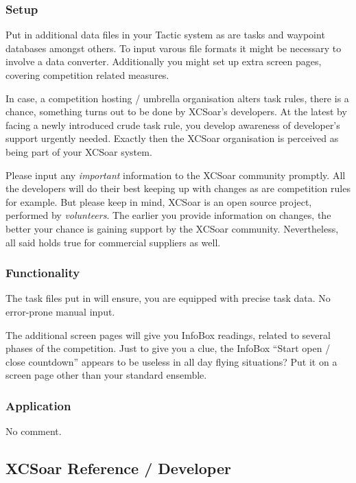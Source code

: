 \subsubsection*{Setup} Put in additional data files in your Tactic system as are 
tasks and waypoint databases amongst others. To input varous file formats it 
might be necessary to involve a data converter. Additionally you might set up 
extra screen pages, covering competition related measures.

In case, a competition hosting / umbrella organisation alters task rules, there 
is a chance, something turns out to be done by XCSoar's developers. At the latest 
by facing a newly introduced crude task rule, you develop awareness of 
developer's support urgently needed. Exactly then the XCSoar organisation is 
perceived as being part of your XCSoar system.

Please input any \emph{important} information to the XCSoar community promptly. 
All the developers will do their best keeping up with changes as are competition 
rules for example. But please keep in mind, XCSoar is an open source project, 
performed by \emph{volunteers}. The earlier you provide information on changes, 
the better your chance is gaining support by the XCSoar community. Nevertheless, 
all said holds true for commercial suppliers as well.  

\subsubsection*{Functionality} The task files put in will ensure, you are 
equipped with precise task data. No error-prone manual input.

The additional screen pages will give you InfoBox readings, related to several 
phases of the competition. Just to give you a clue, the InfoBox ``Start open /
close countdown'' appears to be useless in all day flying situations? Put it on a
screen page other than your standard ensemble.

\subsubsection*{Application}
No comment.

\subsection*{XCSoar Reference / Developer}
